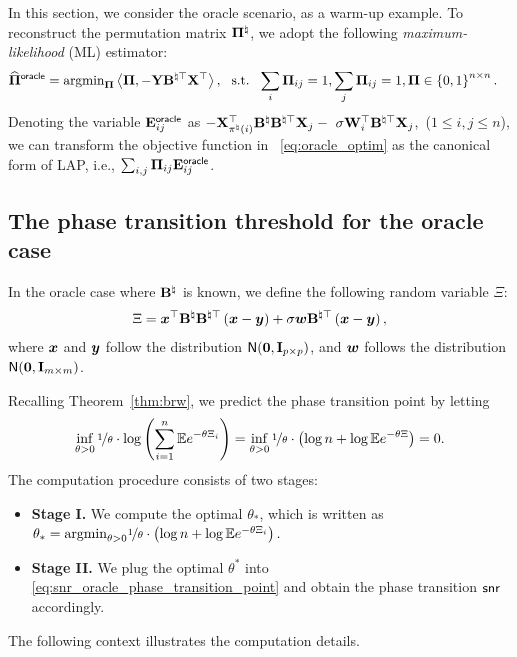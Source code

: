 \documentclass[11pt]{article}
\def \oracle{\mathsf{oracle}}
\begin{document}
\vspace{0.1in}
In this section, we consider the oracle scenario, as a warm-up example.
To reconstruct the permutation matrix $\boldsymbol{\Pi}^{\natural}$,
we adopt the following \emph{maximum-likelihood} (ML) estimator:
\begin{align}
\label{eq:oracle_optim}
\wh{\bPi}^{\oracle}& = \argmin_{\bPi} \la \bPi, -\bY \bB^{\natural \rmt} \bX^{\rmt}\ra,~\St~\sum_i \bPi_{ij} = 1, \sum_j \bPi_{ij} = 1, \bPi \in \set{0, 1}^{n\times n}.
\end{align}
Denoting the variable $\bE^{\oracle}_{ij}$ as
$-\mathbf{X}_{\pi^{\natural}(i)}^{\top}\mathbf{B}^{\natural} \mathbf{B}^{\natural \top}\mathbf{X}_j - \
\sigma \mathbf{W}_{i}^{\top} \mathbf{B}^{\natural \top} \mathbf{X}_j$,~($1\leq i,j \leq n$),
we can transform the objective function in
~\eqref{eq:oracle_optim} as
the canonical form
of LAP, i.e.,
$\sum_{i,j}\bPi_{ij}\bE^{\oracle}_{ij}$.


\subsection{The phase transition threshold for the oracle case}\label{subsec:snr_phase_transition_oracle}






In the oracle case where $\mathbf{B}^{\natural}$ is known, we define the following random variable $\Xi$:
\begin{align}
\label{eq:oracle_xi_def}
\Xi = \boldsymbol{x}^{\top}
\mathbf{B}^{\natural}\mathbf{B}^{\natural\top}\left( \boldsymbol{x} - \boldsymbol{y}\right)
+ \sigma \boldsymbol{w} \mathbf{B}^{\natural \top}\left(\boldsymbol{x} - \boldsymbol{y}\right),
\end{align}
where $\boldsymbol{x}$ and $\boldsymbol{y}$ follow the distribution $\mathsf{N}(\boldsymbol{0}, \mathbf{I}_{p\times p})$,
and $\boldsymbol{w}$ follows the distribution $\mathsf{N}(\boldsymbol{0}, \mathbf{I}_{m\times m})$.

Recalling Theorem~\ref{thm:brw}, we predict the phase transition
point by letting
\begin{align}
\label{eq:snr_oracle_phase_transition_point}
\inf_{\theta > 0} \nicefrac{1}{\theta}\cdot \log \left(\sum_{i=1}^n \mathbb{E} e^{-\theta \Xi_i}\right) =
\inf_{\theta > 0} \nicefrac{1}{\theta}\cdot \left(\log n + \log\mathbb{E} e^{-\theta \Xi}\right) = 0.
\end{align}
The computation procedure consists of two stages:

\begin{itemize}[leftmargin=*]

\item
\textbf{Stage I.}
We compute the optimal $\theta_*$, which is written as
$
\theta_* = \textup{argmin}_{\theta > 0} \nicefrac{1}{\theta}\cdot \left(\log n + \log\mathbb{E} e^{-\theta \Xi_i}\right).
$

\item
\textbf{Stage II.}
We plug the optimal $\theta^*$ into \eqref{eq:snr_oracle_phase_transition_point}
and obtain the phase transition $\mathsf{snr}$ accordingly.
\end{itemize}
The following context illustrates the computation details.
\end{document}
